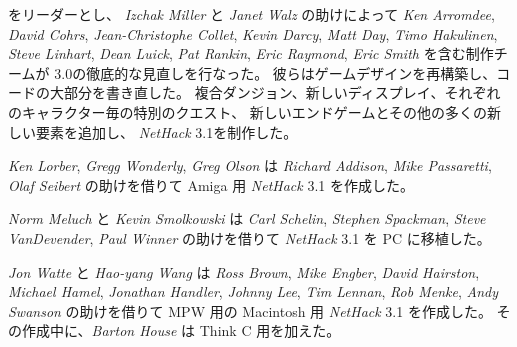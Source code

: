 \medskip
 をリーダーとし、
{\it Izchak Miller\/} と {\it Janet Walz} の助けによって
{\it Ken Arromdee},
{\it David Cohrs}, {\it Jean-Christophe Collet}, {\it Kevin Darcy},
{\it Matt Day}, {\it Timo Hakulinen}, {\it Steve Linhart}, {\it Dean Luick}, 
{\it Pat Rankin}, {\it Eric Raymond}, {\it Eric Smith} を含む制作チームが
3.0の徹底的な見直しを行なった。
彼らはゲームデザインを再構築し、コードの大部分を書き直した。
複合ダンジョン、新しいディスプレイ、それぞれのキャラクター毎の特別のクエスト、
新しいエンドゲームとその他の多くの新しい要素を追加し、
{\it NetHack\/} 3.1を制作した。

\medskip
{\it Ken Lorber}, {\it Gregg Wonderly}, {\it Greg Olson} は
{\it Richard Addison}, {\it Mike Passaretti}, {\it Olaf Seibert} の助けを借りて
Amiga 用 {\it NetHack\/} 3.1 を作成した。

\medskip
{\it Norm Meluch} と {\it Kevin Smolkowski} は 
{\it Carl Schelin}, {\it Stephen Spackman}, {\it Steve VanDevender},
{\it Paul Winner} の助けを借りて {\it NetHack\/} 3.1 を PC に移植した。

\medskip
{\it Jon Watte} と {\it Hao-yang Wang} は
{\it Ross Brown}, {\it Mike Engber}, {\it David Hairston},
{\it Michael Hamel}, {\it Jonathan Handler}, {\it Johnny Lee},
{\it Tim Lennan}, {\it Rob Menke}, {\it Andy Swanson} の助けを借りて
MPW 用の Macintosh 用 {\it NetHack\/} 3.1 を作成した。
その作成中に、{\it Barton House} は Think C 用を加えた。

